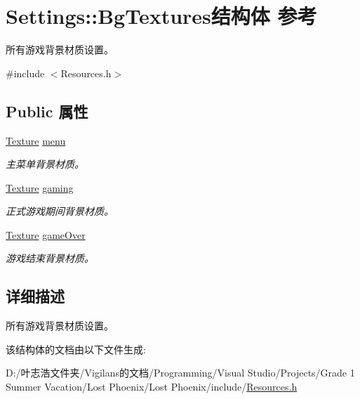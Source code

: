 \hypertarget{struct_settings_1_1_bg_textures}{}\section{Settings\+:\+:Bg\+Textures结构体 参考}
\label{struct_settings_1_1_bg_textures}


所有游戏背景材质设置。  




{\ttfamily \#include $<$Resources.\+h$>$}

\subsection*{Public 属性}
\begin{DoxyCompactItemize}
\item 
\mbox{\label{struct_settings_1_1_bg_textures_ab2f017635aaeb1ee5dbb544f2a053b30}} 
\hyperlink{struct_texture}{Texture} \hyperlink{struct_settings_1_1_bg_textures_ab2f017635aaeb1ee5dbb544f2a053b30}{menu}
\begin{DoxyCompactList}\small\item\em 主菜单背景材质。 \end{DoxyCompactList}\item 
\mbox{\label{struct_settings_1_1_bg_textures_a18b57a3e110a025b0b44ba3d838efc88}} 
\hyperlink{struct_texture}{Texture} \hyperlink{struct_settings_1_1_bg_textures_a18b57a3e110a025b0b44ba3d838efc88}{gaming}
\begin{DoxyCompactList}\small\item\em 正式游戏期间背景材质。 \end{DoxyCompactList}\item 
\mbox{\label{struct_settings_1_1_bg_textures_ab00469bb4e54982cfffe1b7f48f593f2}} 
\hyperlink{struct_texture}{Texture} \hyperlink{struct_settings_1_1_bg_textures_ab00469bb4e54982cfffe1b7f48f593f2}{game\+Over}
\begin{DoxyCompactList}\small\item\em 游戏结束背景材质。 \end{DoxyCompactList}\end{DoxyCompactItemize}


\subsection{详细描述}
所有游戏背景材质设置。 



该结构体的文档由以下文件生成\+:\begin{DoxyCompactItemize}
\item 
D\+:/叶志浩文件夹/\+Vigilans的文档/\+Programming/\+Visual Studio/\+Projects/\+Grade 1 Summer Vacation/\+Lost Phoenix/\+Lost Phoenix/include/\hyperlink{_resources_8h}{Resources.\+h}\end{DoxyCompactItemize}

